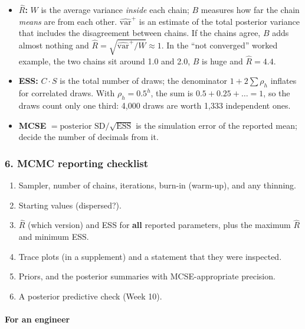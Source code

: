 \begin{itemize}
\tightlist
\item
  \textbf{\(\hat R\):} \(W\) is the average variance \emph{inside} each
  chain; \(B\) measures how far the chain \emph{means} are from each
  other. \(\widehat{\mathrm{var}}^{+}\) is an estimate of the total
  posterior variance that includes the disagreement between chains. If
  the chains agree, \(B\) adds almost nothing and
  \(\hat R = \sqrt{\widehat{\mathrm{var}}^{+}/W} \approx 1\). In the
  ``not converged'' worked example, the two chains sit around 1.0 and
  2.0, \(B\) is huge and \(\hat R = 4.4\).
\item
  \textbf{ESS:} \(C \cdot S\) is the total number of draws; the
  denominator \(1 + 2\sum\rho_h\) inflates for correlated draws. With
  \(\rho_h = 0.5^h\), the sum is \(0.5 + 0.25 + \dots = 1\), so the
  draws count only one third: 4,000 draws are worth 1,333 independent
  ones.
\item
  \textbf{MCSE} \(= \text{posterior SD}/\sqrt{\mathrm{ESS}}\) is the
  simulation error of the reported mean; decide the number of decimals
  from it.
\end{itemize}

\subsubsection{6. MCMC reporting checklist}

\begin{enumerate}
\def\labelenumi{\arabic{enumi}.}
\tightlist
\item
  Sampler, number of chains, iterations, burn-in (warm-up), and any
  thinning.
\item
  Starting values (dispersed?).
\item
  \(\hat R\) (which version) and ESS for \textbf{all} reported
  parameters, plus the maximum \(\hat R\) and minimum ESS.
\item
  Trace plots (in a supplement) and a statement that they were
  inspected.
\item
  Priors, and the posterior summaries with MCSE-appropriate precision.
\item
  A posterior predictive check (Week 10).
\end{enumerate}

\paragraph{For an engineer}

